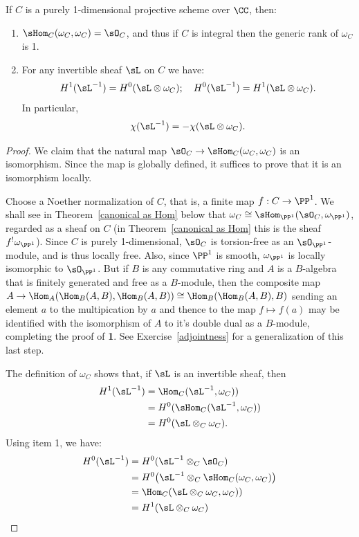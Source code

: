 \begin{proposition}\label{similarities}
If $C$ is a purely 1-dimensional projective scheme over $\CC$, then:
\begin{enumerate}

\item $\sHom_C(\omega_C, \omega_C) = \sO_C$, and  thus if $C$ is integral then the generic rank of $\omega_C$ is 1.

\item For any invertible sheaf $\sL$ on $C$ we have: 
$$
H^1(\sL^{-1})= H^0(\sL\otimes \omega_{C});\quad %
H^0(\sL^{-1} ) = H^1(\sL\otimes \omega_{C}).
$$
In particular,
$$
\chi(\sL^{-1}) = -\chi(\sL\otimes \omega_{C}).
$$

\end{enumerate}
\end{proposition}

\begin{proof}
 We claim that the natural map $\sO_C \to \sHom_C(\omega_C, \omega_C)$ is an isomorphism.
Since the map is globally defined, it suffices to prove that it is an isomorphism locally. 

Choose a Noether
normalization of $C$, that is, a finite map $f: C\to \PP^1$. 
We shall see in Theorem~\ref{canonical as Hom} below that $\omega_C \cong \sHom_{\PP^1}(\sO_C,\omega_{\PP^1})$, regarded as a sheaf on $C$ (in Theorem~\ref{canonical as Hom} this is the sheaf $f^{!}\omega_{\PP^{1}}$).
Since $C$ is purely 1-dimensional, $\sO_{C}$ is torsion-free as an $\sO_{\PP^{1}}$-module, and is thus locally 
free. 
Also, since $\PP^{1}$ is smooth, $\omega_{\PP^{1}}$ is locally
isomorphic to $\sO_{\PP^{1}}$.
But if $B$ is any commutative ring and $A$ is a $B$-algebra that is finitely generated and free as a $B$-module, then the composite map 
$
A \to \Hom_{A}(\Hom_B(A,B),\Hom_B(A,B)) \cong \Hom_{B}(\Hom_B(A,B), B)
$
sending an element $a$ to the multipication by $a$ and thence to the map $f\mapsto f(a)$ may be identified with the isomorphism of $A$ to 
it's double dual as a $B$-module,
completing the proof of {\bf 1}. See Exercise~\ref{adjointness} for a generalization of this last step.


 The definition of $\omega_C$ shows that, if $\sL$ is an invertible sheaf, then
$$
\begin{aligned}
H^1(\sL^{-1}) &= \Hom_C(\sL^{-1}, \omega_C))\\
&= H^0(\sHom_C(\sL^{-1}, \omega_C))\\
&= H^0(\sL\otimes_C \omega_{C}).
\end{aligned}
$$
Using item 1, we have:
$$
\begin{aligned}
H^0 (\sL^{-1})
&= H^0 (\sL^{-1}\otimes_{C}\sO_{C})\\
&= H^0 \bigl(\sL^{-1}\otimes_{C}\sHom_C(\omega_{C}, \omega_{C})\bigr) \\
&= \Hom_{C}(\sL\otimes_C \omega_{C},  \omega_{C}))\\
&= H^{1}(\sL\otimes_{C}\omega_{C}) 
\end{aligned}
$$
 \end{proof}


